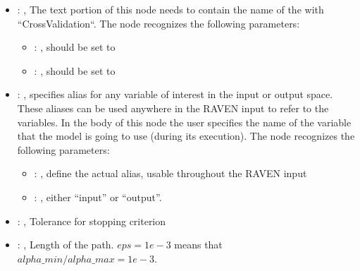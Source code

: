 \begin{itemize}
\begin{itemize}
        \item {}: ,
          List of IDs of features/variables to include in the transformation process.

        \item {}: ,
          Which space to search? Target or Feature?
      \end{itemize}

    \item {}: ,
      The text portion of this node needs to contain the name of the  with
               ``CrossValidation``.
      The  node recognizes the following parameters:
        \begin{itemize}
          \item {}: ,
            should be set to 
          \item {}: ,
            should be set to 
      \end{itemize}

    \item {}: ,
      specifies alias for         any variable of interest in the input or output space. These
      aliases can be used anywhere in the RAVEN input to         refer to the variables. In the body
      of this node the user specifies the name of the variable that the model is going to use
      (during its execution).
      The  node recognizes the following parameters:
        \begin{itemize}
          \item {}: ,
            define the actual alias, usable throughout the RAVEN input
          \item {}: ,
            either ``input'' or ``output''.
      \end{itemize}

    \item {}: ,
      Tolerance for stopping criterion

    \item {}: ,
      Length of the path. $eps=1e-3$ means that
      $alpha\_min / alpha\_max = 1e-3$.


\end{itemize}
